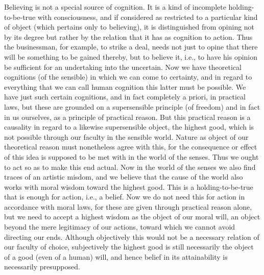 Believing is not a special source of cognition. It is a kind of incomplete holding-to-be-true
with consciousness, and if considered as restricted to a particular kind of object (which
pertains only to believing), it is distinguished from opining not by its degree but rather by the
relation that it has as cognition to action. Thus the businessman, for example, to strike a
deal, needs not just to opine that there will be something to be gained thereby, but to believe
it, i.e., to have his opinion be sufficient for an undertaking into the uncertain. Now we have
theoretical cognitions (of the sensible) in which we can come to certainty, and in regard to
everything that we can call human cognition this latter must be possible. We have just such
certain cognitions, and in fact completely a priori, in practical laws, but these are grounded
on a supersensible principle (of freedom) and in fact in us ourselves, as a principle of practical
reason. But this practical reason is a causality in regard to a likewise supersensible object, the
highest good, which is not possible through our faculty in the sensible world. Nature as object
of our theoretical reason must nonetheless agree with this, for the consequence or effect of this
idea is supposed to be met with in the world of the senses. Thus we ought to act so as to
make this end actual.
Now in the world of the senses we also find traces of an artistic misdom, and we believe
that the cause of the world also works with moral wisdom toward the highest good. This is a
holding-to-be-true that is enough for action, i.e., a belief. Now we do not need this for action
in accordance with moral laws, for these are given through practical reason alone, but we
need to accept a highest wisdom as the object of our moral will, an object beyond the mere
legitimacy of our actions, toward which we cannot avoid directing our ends. Although
objectively this would not be a necessary relation of our faculty of choice, subjectively the
highest good is still necessarily the object of a good (even of a human) will, and hence belief
in its attainability is necessarily presupposed.


